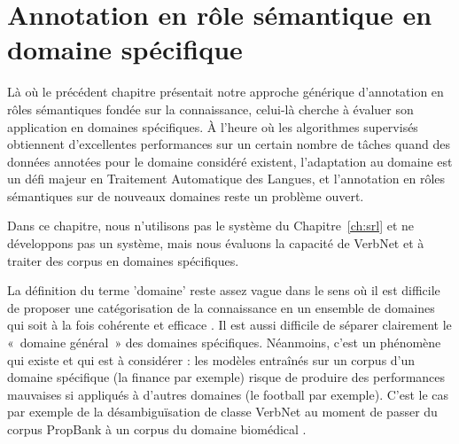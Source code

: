 

\chapter{Annotation en rôle sémantique en domaine spécifique}
\label{ch:domainsrl}

Là où le précédent chapitre présentait notre approche générique d'annotation en
rôles sémantiques fondée sur la connaissance, celui-là cherche à évaluer son
application en domaines spécifiques. À l'heure où les algorithmes supervisés
obtiennent d'excellentes performances sur un certain nombre de tâches quand des
données annotées pour le domaine considéré existent, l'adaptation au domaine
est un défi majeur en Traitement Automatique des Langues, et l'annotation en
rôles sémantiques sur de nouveaux domaines reste un problème ouvert.

Dans ce chapitre, nous n'utilisons pas le système du Chapitre~\ref{ch:srl} et
ne développons pas un système, mais nous évaluons la capacité de VerbNet et
\verbenet{} à traiter des corpus en domaines spécifiques.

La définition du terme 'domaine' reste assez vague dans le sens où il est
difficile de proposer une catégorisation de la connaissance en un ensemble de
domaines qui soit à la fois cohérente et efficace \citep{ma2012rethinking}. Il
est aussi difficile de séparer clairement le «~domaine général~» des domaines
spécifiques. Néanmoins, c'est un phénomène qui existe et qui est à considérer :
les modèles entraînés sur un corpus d'un domaine spécifique (la finance par
exemple) risque de produire des performances mauvaises si appliqués à d'autres
domaines (le football par exemple). C'est le cas par exemple de la
désambiguïsation de classe VerbNet au moment de passer du corpus PropBank à un
corpus du domaine biomédical \citep{abend2008supervised}.

